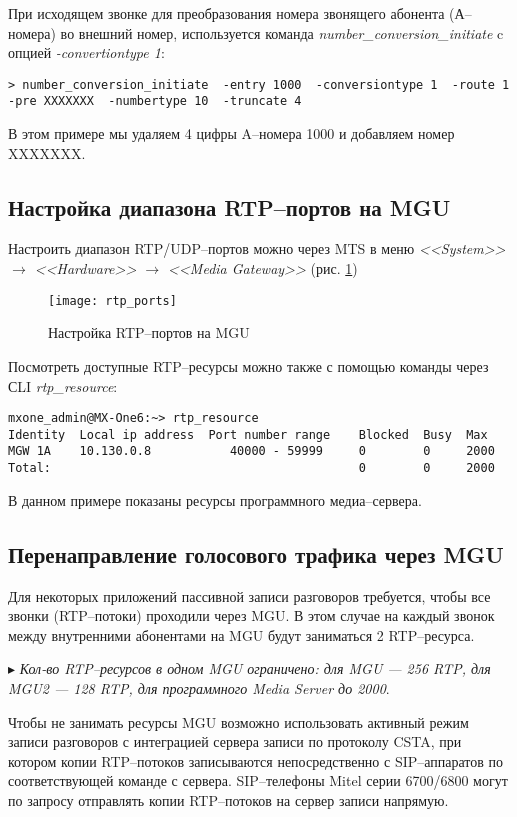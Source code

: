 При исходящем звонке для преобразования номера звонящего абонента (А--номера) во внешний номер, используется команда {\em number\_conversion\_initiate} c опцией {\em -convertiontype 1}:
\begin{lstlisting}
> number_conversion_initiate  -entry 1000  -conversiontype 1  -route 1  -pre XXXXXXX  -numbertype 10  -truncate 4
\end{lstlisting}

В этом примере мы удаляем 4 цифры A--номера 1000 и добавляем номер XXXXXXX.

\subsection{Настройка диапазона RTP--портов на MGU}

Настроить диапазон RTP/UDP--портов можно через MTS в меню {\em <<System>> $\rightarrow$ <<Hardware>> $\rightarrow$ <<Media Gateway>>} (рис. \ref{img:rtp_ports})
\begin{figure}[!ht]
  \center
  \texttt{[image: rtp\_ports]}
  \caption{Настройка RTP--портов на MGU}
  \label{img:rtp_ports}
\end{figure}

Посмотреть доступные RTP--ресурсы можно также с помощью команды через СLI {\em rtp\_resource}: 
\begin{lstlisting}
mxone_admin@MX-One6:~> rtp_resource
Identity  Local ip address  Port number range    Blocked  Busy  Max
MGW 1A    10.130.0.8           40000 - 59999     0        0     2000
Total:                                           0        0     2000
\end{lstlisting}
В данном примере показаны ресурсы программного медиа--сервера.

\subsection{Перенаправление голосового трафика через MGU} \label{subsec:forced}

Для некоторых приложений пассивной записи разговоров требуется, чтобы все звонки (RTP--потоки) проходили через MGU. В этом случае на каждый звонок между внутренними абонентами на MGU будут заниматься 2 RTP--ресурса.

$\blacktriangleright$ {\em Кол-во RTP--ресурсов в одном MGU ограничено: для MGU --- 256 RTP, для MGU2 --- 128 RTP, для программного Media Server до 2000}. 

Чтобы не занимать ресурсы MGU возможно использовать активный режим записи разговоров с интеграцией сервера записи по протоколу CSTA, при котором копии RTP--потоков записываются непосредственно с SIP--аппаратов по соответствующей команде с сервера. SIP--телефоны Mitel серии 6700/6800 могут по запросу отправлять копии RTP--потоков на сервер записи напрямую.

